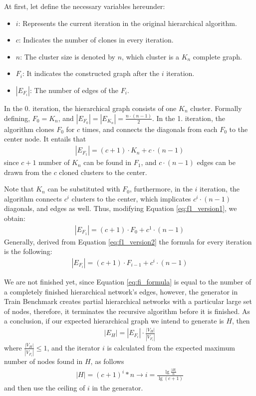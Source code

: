 At first, let define the necessary variables hereunder:
\begin{itemize}
	\item{$i$}: Represents the current iteration in the original hierarchical algorithm.
	\item{$c$}: Indicates the number of clones in every iteration.
	\item{$n$}: The cluster size is denoted by $n$, which cluster is a $K_n$ complete graph.
	\item{$F_i$}: It indicates the constructed graph after the $i$ iteration.
	\item{$|E_{F_i}|$}: The number of edges of the $F_i$.
\end{itemize}

In the 0. iteration, the hierarchical graph consists of one $K_n$ cluster. Formally defining, $F_0 = K_n$, and $|E_{F_0}| = |E_{K_n}| = \frac{n \cdot (n-1)}{2}$. In the 1. iteration, the algorithm clones $F_0$ for $c$ times, and connects the diagonals from each $F_0$ to the center node. It entails that 
\begin{align}\label{eq:f1_version1}
	|E_{F_1}| = (c+1) \cdot K_n + c \cdot (n - 1)	
\end{align}
since $c+1$ number of $K_n$ can be found in $F_1$, and $c \cdot (n - 1)$ edges can be drawn from the $c$ cloned clusters to the center.

Note that $K_n$ can be substituted with $F_0$, furthermore, in the $i$ iteration, the algorithm connects $c^i$ clusters to the center, which implicates $c^i \cdot (n-1)$ diagonals, and edges as well. Thus, modifying Equation \ref{eq:f1_version1}, we obtain:
\begin{align}\label{eq:f1_version2}
	|E_{F_1}| = (c+1) \cdot F_0 + c^1 \cdot (n - 1)	
\end{align}
Generally, derived from Equation \ref{eq:f1_version2} the formula for every iteration is the following:
\begin{align}\label{eq:fi_formula}
	|E_{F_i}| = (c+1) \cdot F_{i-1} + c^i \cdot (n - 1)	
\end{align}

We are not finished yet, since Equation \ref{eq:fi_formula} is equal to the number of a completely finished hierarchical network's edges, however, the generator in Train Benchmark creates partial hierarchical networks with a particular large set of nodes, therefore, it terminates the recursive algorithm before it is finished. As a conclusion, if our expected hierarchical graph we intend to generate is $H$, then
\begin{align}
	|E_H| = |E_{F_i}| \cdot \frac{|V_H|}{|V_{F_i}|}
\end{align}
where $\frac{|V_H|}{|V_{F_i}|} \leq 1$, and the iterator $i$ is calculated from the expected maximum number of nodes found in $H$, as follows
\begin{align}
	|H| = (c+1)^i * n  \longrightarrow  i = \frac{\lg\frac{|H|}{n}}{\lg(c+1)}
\end{align}
and then use the ceiling of $i$ in the generator.
